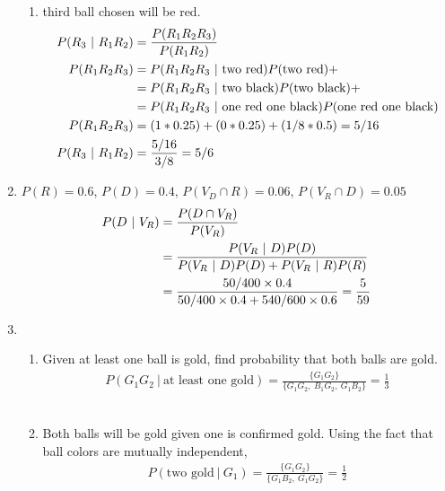 \begin{enumerate}
\begin{enumerate}
		\item third ball chosen will be red. \\
		\begin{subequations}
			\begin{align}
				P(R_3\ |\ R_1 R_2) &= \frac{P(R_1 R_2 R_3)}{P(R_1 R_2)} \\
				P(R_1 R_2 R_3) 	&= P(R_1 R_2 R_3\ |\ \text{two red}) P(\text{two red}) + \nonumber \\
				&= P(R_1 R_2 R_3\ |\ \text{two black}) P(\text{two black}) + \nonumber \\ 
				&= P(R_1 R_2 R_3\ |\ \text{one red one black}) P(\text{one red one black}) \\
				P(R_1 R_2 R_3) 	&= ( 1 * 0.25 ) + (0 * 0.25) + (1/8 * 0.5) = 5/16 \\
				P(R_3\ |\ R_1 R_2) &= \frac{5/16}{3/8} = 5/6
			\end{align} \\
		\end{subequations}
	\end{enumerate}
	
	\item $ P(R) = 0.6 $, $ P(D) = 0.4 $, $ P(V_D \cap R) = 0.06 $, $ P(V_R \cap D) = 0.05 $ \\
	\begin{subequations}
		\begin{align}
			P(D \ |\ V_R) &= \frac{P(D \cap V_R)}{P(V_R)} \\
			&= \frac{P(V_R \ |\ D) P(D)}{P(V_R \ |\ D) P(D) + P(V_R \ |\ R) P(R)} \\
			&= \frac{50/400 \times 0.4}{50/400 \times 0.4 + 540/600 \times 0.6} = \frac{5}{59}
		\end{align}\\
	\end{subequations}
	
	\item \begin{enumerate}
		\item Given at least one ball is gold, find probability that both balls are gold. \\
		\begin{align}
			P(G_1 G_2 \ |\ \text{at least one gold}) = \frac{\{ G_1 G_2 \}}{\{ G_1 G_2,\ B_1 G_2,\ G_1 B_2 \}} = \frac{1}{3}
		\end{align} \\
		
		\item Both balls will be gold given one is confirmed gold. Using the fact that ball colors are mutually independent,\\
		\begin{align}
			P(\text{two gold}\ |\ G_1) = \frac{\{ G_1 G_2 \}}{\{ G_1 B_2 ,\ G_1 G_2\}} = \frac{1}{2}
		\end{align} \\
	\end{enumerate}
	

\end{enumerate}
